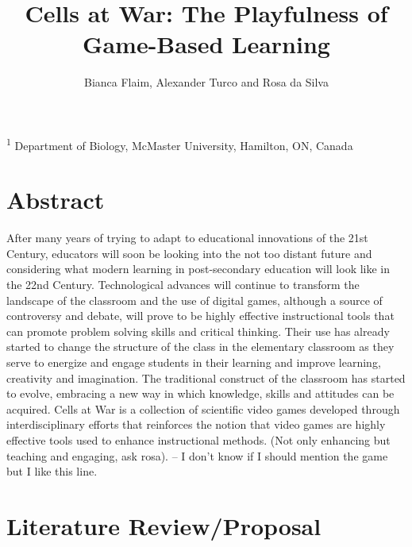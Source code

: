 \documentclass{article}
\title{\sc Cells at War: The Playfulness of Game-Based Learning}
\author{\sc Bianca Flaim, Alexander Turco and Rosa da Silva}
\begin{document}

\onecolumn
                        \maketitle

\thispagestyle{empty}
\noindent \textsuperscript{1} Department of Biology, McMaster University, Hamilton, ON, Canada

\newpage
\tableofcontents
\newpage

\section{Abstract}

After many years of trying to adapt to educational innovations of the 21st Century, educators will soon be looking into the not too distant future and considering what modern learning in post-secondary education will look like in the 22nd Century. Technological advances will continue to transform the landscape of the classroom and the use of digital games, although a source of controversy and debate, will prove to be highly effective instructional tools that can promote problem solving skills and critical thinking. Their use has already started to change the structure of the class in the elementary classroom as they serve to energize and engage students in their learning and improve learning, creativity and imagination. The traditional construct of the classroom has started to evolve, embracing a new way in which knowledge, skills and attitudes can be acquired. Cells at War is a collection of scientific video games developed through interdisciplinary efforts that reinforces the notion that video games are highly effective tools used to enhance instructional methods. (Not only enhancing but teaching and engaging, ask rosa). – I don’t know if I should mention the game but I like this line.

\newpage
       

\section{Literature Review/Proposal}
\end{document}
